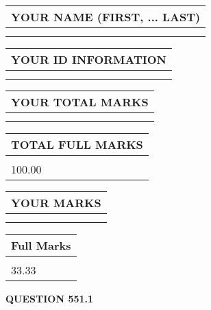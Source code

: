 \documentclass{ctexart}
\begin{document}
   
   
   
\newpage 
\setcounter{page}{ 
   551001 } 
   
   
   
   
\noindent\begin{tabular}{|l|}
\hline
YOUR NAME (FIRST, ... LAST)  \\
\hline
 \\ 
 \\ 
\hline
\end{tabular}
\hspace{0.05in} \begin{tabular}{|l|}
\hline
 YOUR   ID   INFORMATION  \\
\hline
 \\ 
 \\ 
\hline
\end{tabular}
   
   
\vspace{0.2in}\noindent\begin{tabular}{|l|}
\hline
YOUR TOTAL MARKS  \\
\hline
 \\ 
 \\ 
\hline
\end{tabular}
\hspace{0.05in} \begin{tabular}{|l|}
\hline
TOTAL FULL MARKS  \\
\hline
 \\ 
100.00 \\
\hline
\end{tabular}
   
   
 \vspace{0.2in}
 
 
 
 
   
   
  
\vspace{0.2in}
  
\noindent\begin{tabular}{|l|}
\hline
 YOUR MARKS  \\
\hline
 \\ 
 \\ 
\hline
\end{tabular}
\hspace{0.05in} \begin{tabular}{|l|}
\hline
 Full Marks  \\
\hline
 \\ 
33.33 \\
\hline
\end{tabular}
{\textbf{\Large{QUESTION
551.1 
}}}
  
\end{document}
